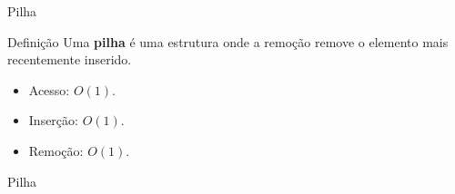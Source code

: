 \begin{frame}{Pilha}

    \begin{block}{Definição}
        Uma {\bf pilha} é uma estrutura onde a remoção remove o elemento mais recentemente inserido.
    \end{block}

    \begin{itemize}
        \item Acesso: $O(1)$.
        \item Inserção: $O(1)$.
        \item Remoção: $O(1)$.
    \end{itemize}

    \begin{block}{Pilha}
        \footnotesize
        \inputminted{cpp}{codigos/pilha.cpp}    
    \end{block}

\end{frame}

